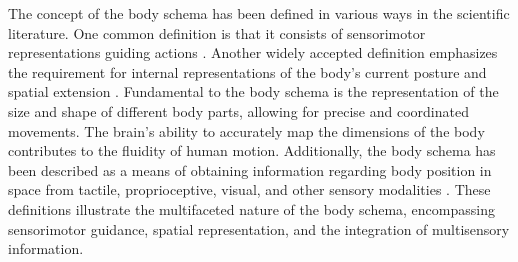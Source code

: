 The concept of the body schema has been defined in various ways in the scientific literature. One common definition is that it consists of sensorimotor representations guiding actions \cite{Maravita2003MultisensoryIntegrationBody}. Another widely accepted definition emphasizes the requirement for internal representations of the body's current posture and spatial extension \cite{Vignemont2010Bodyschemabody}. Fundamental to the body schema is the representation of the size and shape of different body parts, allowing for precise and coordinated movements. The brain's ability to accurately map the dimensions of the body contributes to the fluidity of human motion. Additionally, the body schema has been described as a means of obtaining information regarding body position in space from tactile, proprioceptive, visual, and other sensory modalities \cite{Medina2010mapsformspace}. %
These definitions illustrate the multifaceted nature of the body schema, encompassing sensorimotor guidance, spatial representation, and the integration of multisensory information.


